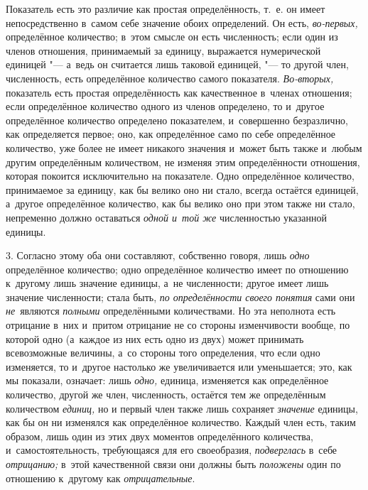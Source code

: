 Показатель есть это различие как простая определённость, т.~е. он имеет
непосредственно в~самом себе значение обоих определений. Он есть, {\em
во-первых,} определённое количество; в~этом смысле он есть численность; если
один из членов отношения, принимаемый за единицу, выражается нумерической
единицей "--- а~ведь он считается лишь таковой единицей, "--- то другой член,
численность, есть определённое количество самого показателя. {\em Во-вторых,}
показатель есть простая определённость как качественное в~членах отношения;
если определённое количество одного из членов определено, то и~другое
определённое количество определено показателем, и~совершенно безразлично, как
определяется первое; оно, как определённое само по себе определённое
количество, уже более не имеет никакого значения и~может быть также и~любым
другим определённым количеством, не изменяя этим определённости отношения,
которая покоится исключительно на показателе. Одно определённое количество,
принимаемое за единицу, как бы велико оно ни стало, всегда остаётся единицей,
а~другое определённое количество, как бы велико оно при этом также ни стало,
непременно должно оставаться {\em одной и~той же} численностью указанной
единицы.

3. Согласно этому оба они составляют, собственно говоря, лишь {\em одно}
определённое количество; одно определённое количество имеет по отношению
к~другому лишь значение единицы, а~не численности; другое имеет лишь значение
численности; стала быть, {\em по определённости своего понятия} сами они
{\em не}~являются {\em полными} определёнными количествами. Но эта неполнота
есть отрицание в~них и~притом отрицание не со стороны изменчивости вообще, по
которой одно (а~каждое из них есть одно из двух) может принимать всевозможные
величины, а~со стороны того определения, что если одно изменяется, то и~другое
настолько же увеличивается или уменьшается; это, как мы показали, означает:
лишь {\em одно,} единица, изменяется как определённое количество, другой же
член, численность, остаётся тем же определённым количеством {\em единиц,} но и
первый член также лишь сохраняет {\em значение} единицы, как бы он ни изменялся
как определённое количество. Каждый член есть, таким образом, лишь один из этих
двух моментов определённого количества, и~самостоятельность, требующаяся для
его своеобразия, {\em подверглась} в~себе {\em отрицанию;} в~этой качественной
связи они должны быть {\em положены} один по отношению к~другому как
{\em отрицательные}.

